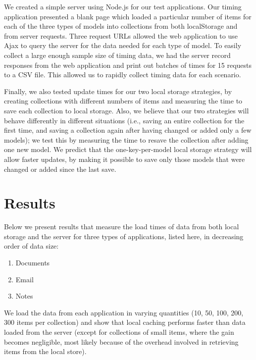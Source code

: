 \documentclass[12pt]{article}
\begin{document}
We created a simple server using Node.js \cite{node} for our test applications. Our timing
application presented a blank page which loaded a particular number of items
for each of the three types of models into collections from both localStorage
and from server requests. Three request URLs allowed the web application to use
Ajax to query the server for the data needed for each type of model. To easily
collect a large enough sample size of timing data, we had the server record
responses from the web application and print out batches of times for 15
requests to a CSV file. This allowed us to rapidly collect timing data for each
scenario.

Finally, we also tested update times for our two local storage strategies, by
creating collections with different numbers of items and measuring the time to
save each collection to local storage. Also, we believe that our two strategies
will behave differently in different situations (i.e., saving an entire
collection for the first time, and saving a collection again after having
changed or added only a few models); we test this by measuring the time to
resave the collection after adding one new model. We predict that the
one-key-per-model local storage strategy will allow faster updates, by making
it possible to save only those models that were changed or added since the last
save.

\section{Results}

Below we present results that measure the load times of data from both local
storage and the server for three types of applications, listed here, in
decreasing order of data size:

\begin{enumerate}
\item Documents
\item Email
\item Notes
\end{enumerate}

We load the data from each application in varying quantities (10, 50, 100, 200,
300 items per collection) and show that local caching performs faster than data
loaded from the server (except for collections of small items, where the gain
becomes negligible, most likely because of the overhead involved in retrieving
items from the local store).
\end{document}

